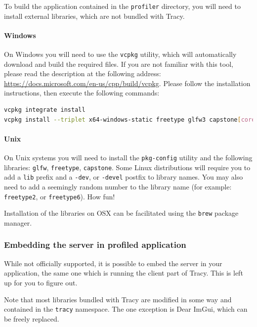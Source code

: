 \documentclass[hidelinks,titlepage,a4paper]{article}
\begin{document}
To build the application contained in the \texttt{profiler} directory, you will need to install external libraries, which are not bundled with Tracy.

\paragraph{Windows}

On Windows you will need to use the \texttt{vcpkg} utility, which will automatically download and build the required files. If you are not familiar with this tool, please read the description at the following address: \url{https://docs.microsoft.com/en-us/cpp/build/vcpkg}. Please follow the installation instructions, then execute the following commands:

\begin{lstlisting}[language=sh]
vcpkg integrate install
vcpkg install --triplet x64-windows-static freetype glfw3 capstone[core,arm,arm64,x86]
\end{lstlisting}

\paragraph{Unix}

On Unix systems you will need to install the \texttt{pkg-config} utility and the following libraries: \texttt{glfw}, \texttt{freetype}, \texttt{capstone}. Some Linux distributions will require you to add a \texttt{lib} prefix and a \texttt{-dev}, or \texttt{-devel} postfix to library names. You may also need to add a seemingly random number to the library name (for example: \texttt{freetype2}, or \texttt{freetype6}). How fun!

Installation of the libraries on OSX can be facilitated using the \texttt{brew} package manager.

\subsubsection{Embedding the server in profiled application}
\label{embeddingserver}

While not officially supported, it is possible to embed the server in your application, the same one which is running the client part of Tracy. This is left up for you to figure out.

Note that most libraries bundled with Tracy are modified in some way and contained in the \texttt{tracy} namespace. The one exception is Dear ImGui, which can be freely replaced.
\end{document}
